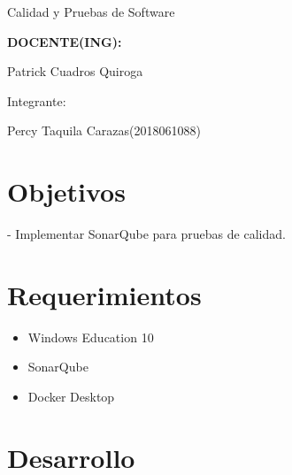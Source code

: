 \documentclass[12pt,letterpaper]{article}
\begin{document}
\begin{titlepage}
\begin{center}
\vspace*{0.1in}
\begin{large}
Calidad y Pruebas de Software\\
\end{large}

\vspace*{0.3in}
\begin{Large}
\textbf{DOCENTE(ING):} \\
\end{Large}

\vspace*{0.1in}
\begin{large}
 Patrick Cuadros Quiroga\\
\end{large}

\vspace*{0.2in}
\vspace*{0.1in}
\begin{large}
Integrante: \\
\begin{flushleft}
Percy Taquila Carazas\hfill	(2018061088) \\
\end{flushleft}
\end{large}
\end{center}

\end{titlepage}

\tableofcontents %
\thispagestyle{empty} %
\newpage
\setcounter{page}{1} %


\section{Objetivos} 

- Implementar SonarQube para pruebas de calidad.


\section{Requerimientos} 

\begin{itemize}
\item Windows Education 10
\item  SonarQube
\item Docker Desktop
\end{itemize}



\section{Desarrollo}
\end{document}
